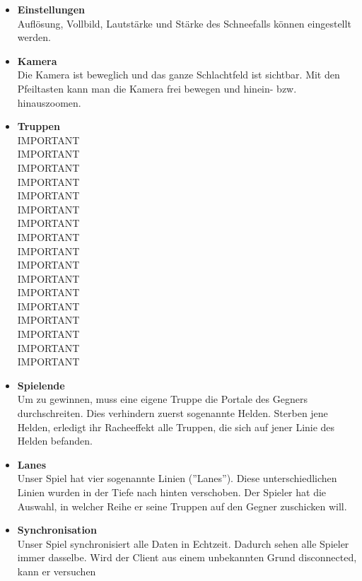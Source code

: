 \begin{itemize}
\begin{itemize}
        \end{itemize}
    \item \textbf{Einstellungen} \\
        Auflösung, Vollbild, Lautstärke und Stärke des Schneefalls können eingestellt werden.
    \item \textbf{Kamera} \\
        Die Kamera ist beweglich und das ganze Schlachtfeld ist sichtbar. Mit den Pfeiltasten kann man die Kamera frei bewegen und hinein- bzw. hinauszoomen.
    \item \textbf{Truppen} \\
        IMPORTANT\\
        IMPORTANT\\
        IMPORTANT\\
        IMPORTANT\\
        IMPORTANT\\
        IMPORTANT\\
        IMPORTANT\\
        IMPORTANT\\
        IMPORTANT\\
        IMPORTANT\\
        IMPORTANT\\
        IMPORTANT\\
        IMPORTANT\\
        IMPORTANT\\
        IMPORTANT\\
        IMPORTANT\\
        IMPORTANT\\
    \item \textbf{Spielende} \\
        Um zu gewinnen, muss eine eigene Truppe die Portale des Gegners durchschreiten. Dies verhindern zuerst sogenannte Helden. Sterben jene Helden, erledigt ihr Racheeffekt alle
        Truppen, die sich auf jener Linie des Helden befanden.
    \item \textbf{Lanes} \\
        Unser Spiel hat vier sogenannte Linien (''Lanes''). Diese unterschiedlichen Linien wurden in der Tiefe nach hinten verschoben. Der Spieler hat die Auswahl, in welcher Reihe er seine Truppen auf den Gegner zuschicken will.
    \item \textbf{Synchronisation} \\
        Unser Spiel synchronisiert alle Daten in Echtzeit. Dadurch sehen alle Spieler immer dasselbe. Wird der Client aus einem unbekannten Grund disconnected, kann er versuchen

\end{itemize}
